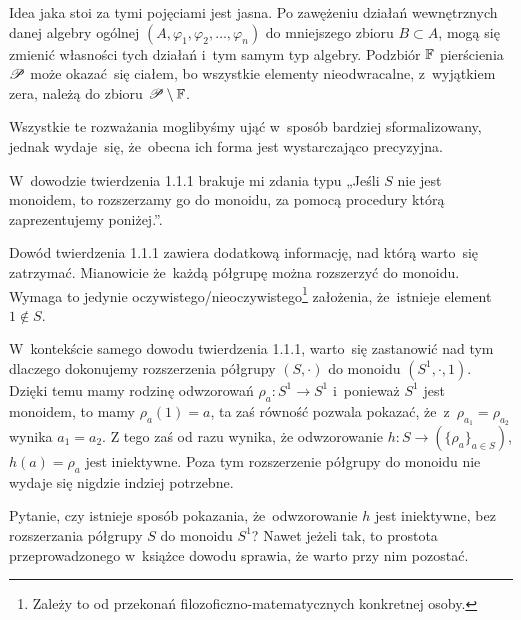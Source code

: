 \documentclass[a4paper,11pt]{article}
\begin{document}
Idea jaka stoi za tymi pojęciami jest jasna. Po zawężeniu działań
wewnętrznych danej algebry ogólnej $( A, \varphi_{ 1 }, \varphi_{ 2 }, \ldots, \varphi_{ n } )$ do
mniejszego zbioru $B \subset A$, mogą się zmienić własności tych działań i~tym
samym typ algebry. Podzbiór $\mathbb{F}$ pierścienia $\mathcal{P}$ może okazać~się
ciałem, bo wszystkie elementy nieodwracalne, z~wyjątkiem zera, należą do
zbioru $\mathcal{P} \setminus \mathbb{F}$.

Wszystkie te rozważania moglibyśmy ująć w~sposób bardziej sformalizowany,
jednak wydaje~się, że~obecna ich forma jest wystarczająco precyzyjna.

\vspace{\spaceFour}





\start {} W~dowodzie twierdzenia 1.1.1 brakuje mi zdania typu
„Jeśli $S$ nie jest monoidem, to rozszerzamy go do monoidu, za pomocą
procedury którą zaprezentujemy poniżej.”.

\vspace{\spaceFour}





\start {} Dowód twierdzenia 1.1.1 zawiera dodatkową informację,
nad którą warto~się zatrzymać. Mianowicie że~każdą półgrupę można
rozszerzyć do monoidu. Wymaga to jedynie
oczywistego/nieoczywistego\footnote{Zależy to od przekonań
  filozoficzno-matematycznych konkretnej osoby.} założenia, że~istnieje
element $1 \notin S$.

W~kontekście samego dowodu twierdzenia 1.1.1, warto~się zastanowić nad
tym dlaczego dokonujemy rozszerzenia półgrupy $( S, \cdot )$ do
monoidu $( S^{ 1 }, \cdot, 1 )$. Dzięki temu mamy rodzinę odwzorowań
$\rho_{ a } : S^{ 1 } \to S^{ 1 }$ i~ponieważ $S^{ 1 }$ jest monoidem,
to mamy $\rho_{ a }( 1 ) = a$, ta zaś równość pozwala pokazać,
że~z~$\rho_{ a_{ 1 } } = \rho_{ a_{ 2 } }$ wynika $a_{ 1 } = a_{ 2 }$.
Z tego zaś od razu wynika, że odwzorowanie
$h : S \to ( \{ \rho_{ a } \}_{ a \in S } )$, $h( a ) = \rho_{ a }$
jest iniektywne. Poza tym rozszerzenie półgrupy do monoidu nie wydaje
się nigdzie indziej potrzebne.

Pytanie, czy istnieje sposób pokazania, że~odwzorowanie $h$ jest
iniektywne, bez rozszerzania półgrupy $S$ do monoidu $S^{ 1 }$? Nawet
jeżeli tak, to prostota przeprowadzonego w~książce dowodu sprawia, że
warto przy nim pozostać.

\vspace{\spaceFour}
\end{document}
